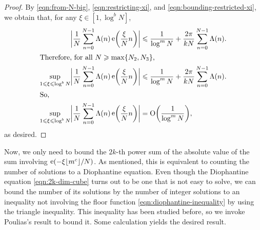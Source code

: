 \documentclass[letterpaper, 12pt]{article}
\theoremstyle{plain}
\theoremstyle{definition}
\theoremstyle{plain}
\theoremstyle{plain}
\numberwithin{equation}{section}
\newcommand{\Oh}{{\rm O}}
\renewcommand{\leq}{\leqslant}
\renewcommand{\geq}{\geqslant}
\newcommand{\1}{\textbf{1}}
\DeclarePairedDelimiter\floor{\lfloor}{\rfloor}
\DeclareMathOperator{\e}{e}
\begin{document}
\begin{proof}
    By \cref{eqn:from-N-big}, \cref{eqn:restricting-xi}, and \cref{eqn:bounding-restricted-xi}, we obtain that, for any $\xi \in [1, \log^b N]$,
    \begin{align*}
        \biggl\lvert \frac{1}{N} \sum_{n = 0}^{N - 1} \Lambda(n) \e\biggl(\frac{\xi}{N} n \biggr) \biggr\rvert
        &\leq \frac{1}{\log^m N} + \frac{2\pi}{kN} \sum_{n = 0}^{N - 1} \Lambda(n).\\
    \intertext{Therefore, for all \(N \geq \max\{N_2, N_3\}\),}
        \sup_{1 \leq \xi \leq \log^b N} \biggl\lvert \frac{1}{N} \sum_{n = 0}^{N - 1} \Lambda(n) \e\biggl(\frac{\xi}{N} n \biggr) \biggr\rvert
        &\leq \frac{1}{\log^m N} + \frac{2\pi}{kN} \sum_{n = 0}^{N - 1} \Lambda(n).\\
    \intertext{So,}
        \sup_{1\leq \xi \leq \log^b N} \biggl\lvert \frac{1}{N} \sum_{n = 0}^{N - 1} \Lambda(n) \e\biggl(\frac{\xi}{N} n \biggr) \biggr\rvert 
        &= \Oh \biggl(\frac{1}{\log^m N} \biggr),
    \end{align*} 
    as desired.
\end{proof}

Now, we only need to bound the $2k$-th power sum of the absolute value of the sum involving $\e(-\xi \floor{m^c}/N)$. As mentioned, this is equivalent to counting the number of solutions to a Diophantine equation. Even though the Diophantine equation \eqref{eqn:2k-dim-cube} turns out to be one that is not easy to solve, we can bound the number of its solutions by the number of integer solutions to an inequality not involving the floor function \eqref{eqn:diophantine-inequality} by using the triangle inequality. This inequality has been studied before, so we invoke Poulias's result \cite{poulias2021} to bound it. Some calculation yields the desired result.
\end{document}
